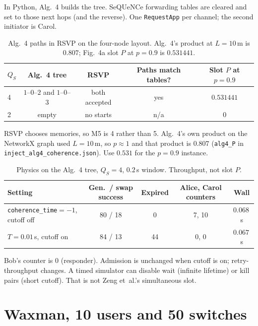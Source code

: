 \documentclass[11pt]{article}
\begin{document}
In Python, Alg.~4 builds the tree.
SeQUeNCe forwarding tables are cleared and set to those next hops (and the reverse).
One \texttt{RequestApp} per channel; the second initiator is Carol.

\begin{table}[h]
\centering
\caption{Alg.~4 paths in RSVP on the four-node layout. Alg.~4's product at $L=10$\,m is $0.807$; Fig.~4a slot $P$ at $p=0.9$ is $0.531441$.}
\begin{tabular}{@{}lcccc@{}}
\toprule
$Q_S$ & Alg.~4 tree & RSVP & Paths match tables? & Slot $P$ at $p=0.9$ \\
\midrule
4 & $1$--$0$--$2$ and $1$--$0$--$3$ & both accepted & yes & $0.531441$ \\
2 & empty & no starts & n/a & $0$ \\
\bottomrule
\end{tabular}
\end{table}

RSVP chooses memories, so M5 is 4 rather than 5.
Alg.~4's own product on the NetworkX graph used $L=10$\,m, so $p\approx 1$ and that product is $0.807$ (\texttt{alg4\_P} in \texttt{inject\_alg4\_coherence.json}).
Use $0.531$ for the $p=0.9$ instance.

\begin{table}[h]
\centering
\caption{Physics on the Alg.~4 tree, $Q_S=4$, $0.2$\,s window. Throughput, not slot $P$.}
\label{tab:coh}
\begin{tabular}{@{}lcccc@{}}
\toprule
Setting & Gen.\ / swap success & Expired & Alice, Carol counters & Wall \\
\midrule
\texttt{coherence\_time}${=}{-}1$, cutoff off & 80 / 18 & 0 & 7, 10 & $0.068$\,s \\
$T=0.01$\,s, cutoff on & 84 / 13 & 44 & 0, 0 & $0.067$\,s \\
\bottomrule
\end{tabular}
\end{table}

Bob's counter is 0 (responder).
Admission is unchanged when cutoff is on; retry-throughput changes.
A timed simulator can disable wait (infinite lifetime) or kill pairs (short cutoff).
That is not Zeng et~al.'s simultaneous slot.

\section{Waxman, 10 users and 50 switches}
\end{document}
